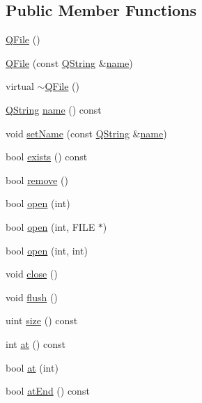 \subsection*{Public Member Functions}
\begin{DoxyCompactItemize}
\item 
\mbox{\hyperlink{class_q_file_a4594575fa1a7d3ff40250fb52362cdf9}{Q\+File}} ()
\item 
\mbox{\hyperlink{class_q_file_a2f6f03b893a6accdf03672698154c0ac}{Q\+File}} (const \mbox{\hyperlink{class_q_string}{Q\+String}} \&\mbox{\hyperlink{class_q_file_ad14b368c041b9e2d22bbd4428f859b29}{name}})
\item 
virtual \mbox{\hyperlink{class_q_file_acc10a60e8d9d8b873a43ab9be0b5c137}{$\sim$\+Q\+File}} ()
\item 
\mbox{\hyperlink{class_q_string}{Q\+String}} \mbox{\hyperlink{class_q_file_ad14b368c041b9e2d22bbd4428f859b29}{name}} () const
\item 
void \mbox{\hyperlink{class_q_file_aedc2f51f8c46021cfb4ae82bae0e3b2d}{set\+Name}} (const \mbox{\hyperlink{class_q_string}{Q\+String}} \&\mbox{\hyperlink{class_q_file_ad14b368c041b9e2d22bbd4428f859b29}{name}})
\item 
bool \mbox{\hyperlink{class_q_file_ad3329694f62a9bb5730f6ba709f8b7cc}{exists}} () const
\item 
bool \mbox{\hyperlink{class_q_file_a57d95ea99c22b455ef0fa232299eba11}{remove}} ()
\item 
bool \mbox{\hyperlink{class_q_file_af10aeafc303904f98b74be9752d2aa43}{open}} (int)
\item 
bool \mbox{\hyperlink{class_q_file_af97fe0dd1ca0aa8b0a0c72b726a32860}{open}} (int, F\+I\+LE $\ast$)
\item 
bool \mbox{\hyperlink{class_q_file_ac09fbb92aa5fe9e11c6d282e12a72ae5}{open}} (int, int)
\item 
void \mbox{\hyperlink{class_q_file_ac0d8375a5ea7d4503545d7c68dcf58e1}{close}} ()
\item 
void \mbox{\hyperlink{class_q_file_a6d450a55bc3a8145fd33a7ee08051830}{flush}} ()
\item 
uint \mbox{\hyperlink{class_q_file_ae6d2d1ffc423701e6acfc7be48a11e73}{size}} () const
\item 
int \mbox{\hyperlink{class_q_file_aa156f3896b35b0c6f6e9cf9237bf34bf}{at}} () const
\item 
bool \mbox{\hyperlink{class_q_file_aa2f5e380a549e7d3043cf41ac8c57eba}{at}} (int)
\item 
bool \mbox{\hyperlink{class_q_file_a285a896990bd1779c7b3a7066142446b}{at\+End}} () const

\end{DoxyCompactItemize}
